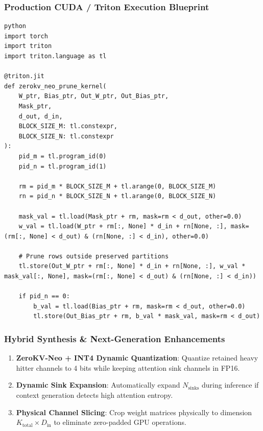 \subsubsection*{Production CUDA / Triton Execution Blueprint}

\vspace{0.5em}
\begin{mdframed}[backgroundcolor=codebg, linecolor=codeframe, linewidth=1pt, roundcorner=4pt, innerleftmargin=2pt, innerrightmargin=5pt, innertopmargin=5pt, innerbottommargin=5pt]
\begin{lstlisting}
python
import torch
import triton
import triton.language as tl

@triton.jit
def zerokv_neo_prune_kernel(
    W_ptr, Bias_ptr, Out_W_ptr, Out_Bias_ptr,
    Mask_ptr,
    d_out, d_in,
    BLOCK_SIZE_M: tl.constexpr,
    BLOCK_SIZE_N: tl.constexpr
):
    pid_m = tl.program_id(0)
    pid_n = tl.program_id(1)

    rm = pid_m * BLOCK_SIZE_M + tl.arange(0, BLOCK_SIZE_M)
    rn = pid_n * BLOCK_SIZE_N + tl.arange(0, BLOCK_SIZE_N)

    mask_val = tl.load(Mask_ptr + rm, mask=rm < d_out, other=0.0)
    w_val = tl.load(W_ptr + rm[:, None] * d_in + rn[None, :], mask=(rm[:, None] < d_out) & (rn[None, :] < d_in), other=0.0)

    # Prune rows outside preserved partitions
    tl.store(Out_W_ptr + rm[:, None] * d_in + rn[None, :], w_val * mask_val[:, None], mask=(rm[:, None] < d_out) & (rn[None, :] < d_in))

    if pid_n == 0:
        b_val = tl.load(Bias_ptr + rm, mask=rm < d_out, other=0.0)
        tl.store(Out_Bias_ptr + rm, b_val * mask_val, mask=rm < d_out)
\end{lstlisting}
\end{mdframed}
\vspace{0.5em}


\subsubsection*{Hybrid Synthesis \& Next-Generation Enhancements}

\begin{enumerate}
\item \textbf{ZeroKV-Neo + INT4 Dynamic Quantization}: Quantize retained heavy hitter channels to 4 bits while keeping attention sink channels in FP16.
\item \textbf{Dynamic Sink Expansion}: Automatically expand $N_{\text{sinks}}$ during inference if context generation detects high attention entropy.
\item \textbf{Physical Channel Slicing}: Crop weight matrices physically to dimension $K_{\text{total}} \times D_{\text{in}}$ to eliminate zero-padded GPU operations.

\end{enumerate}
